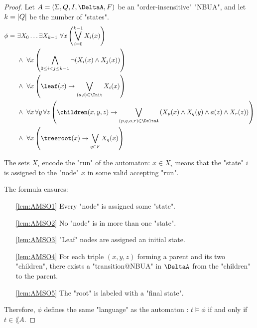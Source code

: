\documentclass[a4paper,UKenglish,cleveref, autoref, thm-restate]{lipics-v2021}
\begin{document}
\begin{proof}
	Let $A = \NBUA$ be an "order-insensitive" "NBUA", and let $k = \left|Q\right|$ be the number of "states".
	\begin{align}
		\phi =\  & \exists X_0 \ldots \exists X_{k-1} \ \forall x \left( \bigvee_{i=0}^{k-1} X_i(x) \right) \label{lem:AMSO1}                                                                                     \\
		         & \land\ \forall x \left( \bigwedge_{0 \leq i < j \leq k-1} \lnot (X_i(x) \land X_j(x)) \right) \label{lem:AMSO2}                                                                                \\
		         & \land\ \forall x \left( \leaf(x) \rightarrow \bigvee_{(a,i) \in \Init} X_i(x) \right) \label{lem:AMSO3}                                                                                        \\
		         & \land\ \forall x\, \forall y\, \forall z \left(\children(x,y,z) \rightarrow \bigvee_{(p,q,a,r) \in \DeltaA} \left(X_p(x) \land X_q(y) \land a(z) \land X_r(z)\right) \right) \label{lem:AMSO4} \\
		         & \land\ \forall x \left( \treeroot(x) \rightarrow \bigvee_{q \in F} X_q(x) \right) \label{lem:AMSO5}
	\end{align}

	The sets $X_i$ encode the "run" of the automaton: $x \in X_i$ means that the "state" $i$ is assigned to the "node" $x$ in some valid accepting "run".

	The formula ensures:

	\begin{itemize}
		\item[\ref{lem:AMSO1}] Every "node" is assigned some "state".
		\item[\ref{lem:AMSO2}] No "node" is in more than one "state".
		\item[\ref{lem:AMSO3}] "Leaf" nodes are assigned an initial state.
		\item[\ref{lem:AMSO4}] For each triple $(x,y,z)$ forming a parent and its two "children",
		      there exists a "transition@NBUA" in $\DeltaA$ from the "children" to the parent.
		\item[\ref{lem:AMSO5}] The "root" is labeled with a "final state".
	\end{itemize}

	Therefore, $\phi$ defines the same "language" as the automaton : $t \models \phi$ if and only if  $t \in \lang A$.
\end{proof}
\end{document}
